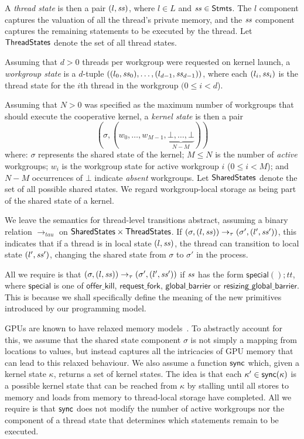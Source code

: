 \documentclass[sigconf]{acmart}
\newcommand{\offerfork}{\mathsf{request\_fork}}
\newcommand{\offerkill}{\mathsf{offer\_kill}}
\newcommand{\globalbarrier}{\mathsf{global\_barrier}}
\newcommand{\resizingglobalbarrier}{\mathsf{resizing\_global\_barrier}}
\begin{document}
{A \emph{thread state} is then a pair $(l, \mathit{ss})$, where $l \in L$ and
$\mathit{ss} \in \mathsf{Stmts}$.  The $l$ component captures the valuation of all the
thread's private memory, and the $\mathit{ss}$ component captures the
remaining statements to be executed by the thread.  Let $\mathsf{ThreadStates}$ denote the set of all thread states.

Assuming that $d > 0$ threads per workgroup were requested on kernel launch, a \emph{workgroup state}
is a $d$-tuple $((l_0, \mathit{ss}_0), \dots, (l_{d-1}, \mathit{ss}_{d-1}))$, where each $(l_i, \mathit{ss}_i)$ is the thread state for the $i$th thread in the workgroup $(0\leq i < d$).

Assuming that $N > 0$ was specified as the maximum number of
workgroups that should execute the cooperative kernel, a \emph{kernel
  state} is then a pair
%
\[
(\sigma, (w_0, \dots, w_{M-1}, \underbrace{\bot, \dots,
\bot}_{N-M}))\]
%
where: $\sigma$ represents the shared state of the kernel; $M \leq N$
is the number of \emph{active} workgroups; $w_i$ is the workgroup
state for active workgroup $i$ ($0 \leq i < M$); and $N-M$ occurrences
of $\bot$ indicate \emph{absent} workgroups.  Let $\mathsf{SharedStates}$
denote the set of all possible shared states.  We regard
workgroup-local storage as being part of the shared state of a kernel.

%
We leave the semantics for thread-level transitions abstract, assuming
a binary relation $\rightarrow_{tau}$ on $\mathsf{SharedStates}{} \times
\mathsf{ThreadStates}{}$.  If $(\sigma, (l, \mathit{ss})) \rightarrow_{\tau}
(\sigma', (l', \mathit{ss}'))$, this indicates that if a thread is in local
state $(l, \mathit{ss})$, the thread can transition to local state $(l',
\mathit{ss}')$, changing the shared state from $\sigma$ to $\sigma'$ in the
process.

All we require is that $(\sigma, (l, \mathit{ss})) \rightarrow_{\tau}
(\sigma', (l', \mathit{ss}'))$ if $\mathit{ss}$ has the form $\mathsf{special}();
\mathit{tt}$, where $\mathsf{special}$ is one of $\offerkill$,
$\offerfork$, $\globalbarrier$ or $\resizingglobalbarrier$.  This is
because we shall specifically define the meaning of the new primitives
introduced by our programming model.

%
GPUs are known to have relaxed memory models~\cite{ABDGKPSW-2015}.  To abstractly
account for this, we assume that the shared state component $\sigma$
is not simply a mapping from locations to values, but instead
captures all the intricacies of GPU memory that can lead to this
relaxed behaviour.  We also assume a function $\mathsf{sync}$ which, given a
kernel state $\kappa$, returns a set of kernel states.  The idea is
that each $\kappa' \in \mathsf{sync}(\kappa)$ is a possible kernel state that
can be reached from $\kappa$ by stalling until all stores to memory
and loads from memory to thread-local storage have completed.  All we
require is that $\mathsf{sync}$ does not modify the number of active
workgroups nor the component of a thread state that determines which
statements remain to be executed.

}
\end{document}
